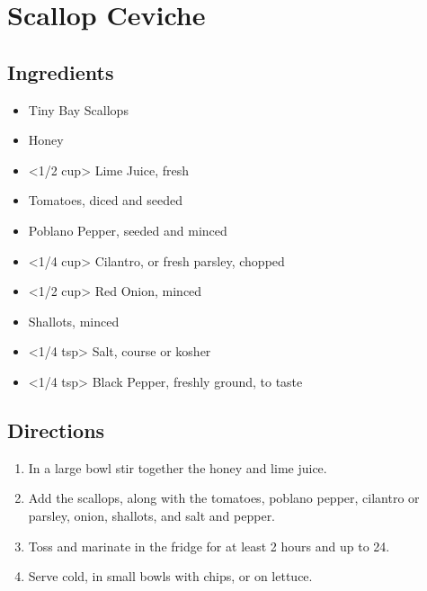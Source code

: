 \section{Scallop Ceviche}

\subsection{ Ingredients }

\begin{itemize}
  \item <1 lb> Tiny Bay Scallops
  \item <2 tbs> Honey
  \item <1/2 cup> Lime Juice, fresh
  \item <1 cup> Tomatoes, diced and seeded
  \item <2 tbs> Poblano Pepper, seeded and minced
  \item <1/4 cup> Cilantro, or fresh parsley, chopped 
  \item <1/2 cup> Red Onion, minced
  \item <2 tbs> Shallots, minced
  \item <1/4 tsp> Salt, course or kosher
  \item <1/4 tsp> Black Pepper, freshly ground, to taste
\end{itemize}

\subsection{ Directions }

\begin{enumerate}
  \item In a large bowl stir together the honey and lime juice. 
  \item Add the scallops, along with the tomatoes, poblano pepper, cilantro or parsley, onion, shallots, and salt and pepper. 
  \item Toss and marinate in the fridge for at least 2 hours and up to 24.
  \item Serve cold, in small bowls with chips, or on lettuce.
\end{enumerate}
